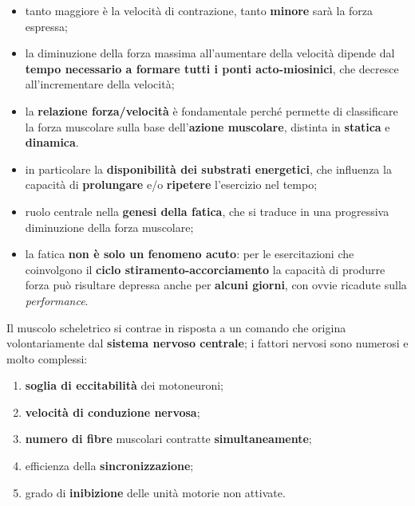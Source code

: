 \begin{itemize}
  \item tanto maggiore è la velocità di contrazione, tanto \textbf{minore} sarà la forza espressa;
  \item la diminuzione della forza massima all'aumentare della velocità dipende dal \textbf{tempo
    necessario a formare tutti i ponti acto-miosinici}, che decresce all'incrementare della
    velocità;
  \item la \textbf{relazione forza/velocità} è fondamentale perché permette di classificare la forza
    muscolare sulla base dell'\textbf{azione muscolare}, distinta in \textbf{statica} e
    \textbf{dinamica}.
\end{itemize}

\begin{itemize}
  \item in particolare la \textbf{disponibilità dei substrati energetici}, che influenza la capacità
    di \textbf{prolungare} e/o \textbf{ripetere} l'esercizio nel tempo;
  \item ruolo centrale nella \textbf{genesi della fatica}, che si traduce in una progressiva
    diminuzione della forza muscolare;
  \item la fatica \textbf{non è solo un fenomeno acuto}: per le esercitazioni che coinvolgono il
    \textbf{ciclo stiramento-accorciamento} la capacità di produrre forza può risultare depressa
    anche per \textbf{alcuni giorni}, con ovvie ricadute sulla \textit{performance}.
\end{itemize}

Il muscolo scheletrico si contrae in risposta a un comando che origina volontariamente dal
\textbf{sistema nervoso centrale}; i fattori nervosi sono numerosi e molto complessi:
\begin{enumerate}
  \item \textbf{soglia di eccitabilità} dei motoneuroni;
  \item \textbf{velocità di conduzione nervosa};
  \item \textbf{numero di fibre} muscolari contratte \textbf{simultaneamente};
  \item efficienza della \textbf{sincronizzazione};
  \item grado di \textbf{inibizione} delle unità motorie non attivate.
\end{enumerate}

